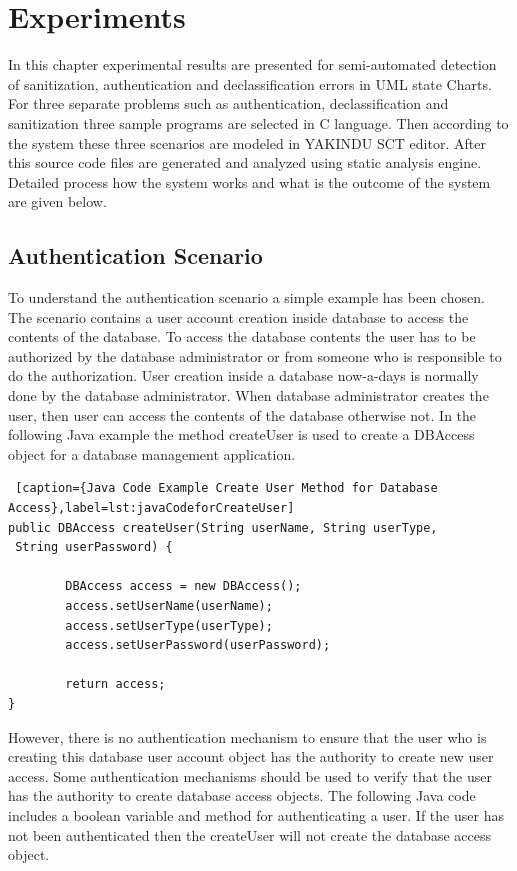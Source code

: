 \chapter{Experiments}
In this chapter experimental results are presented for semi-automated detection of sanitization, authentication and declassification errors in UML state Charts. For three separate problems such as authentication, declassification and sanitization three sample programs are selected in C language. Then according to the system these three scenarios are modeled in YAKINDU SCT editor. After this source code files are generated and analyzed using static analysis engine. Detailed process how the system works and what is the outcome of the system are given below.

\section{Authentication Scenario}

To understand the authentication scenario a simple example has been chosen. The scenario contains a user account creation inside database to access the contents of the database. To access the database contents the user has to be authorized by the database administrator or from someone who is responsible to do the authorization. User creation inside a database now-a-days is normally done by the database administrator. When database administrator creates the user, then user can access the contents of the database otherwise not. In the following Java example the method createUser is used to create a DBAccess object for a database management application.

\begin{lstlisting} [caption={Java Code Example Create User Method for Database Access},label=lst:javaCodeforCreateUser]
public DBAccess createUser(String userName, String userType,
 String userPassword) {

		DBAccess access = new DBAccess();
		access.setUserName(userName);
		access.setUserType(userType);
		access.setUserPassword(userPassword);	
				
		return access;
}

\end{lstlisting}

However, there is no authentication mechanism to ensure that the user who is creating this database user account object has the authority to create new user access. Some authentication mechanisms should be used to verify that the user has the authority to create database access objects.
The following Java code includes a boolean variable and method for authenticating a user. If the user has not been authenticated then the createUser will not create the database access object.

